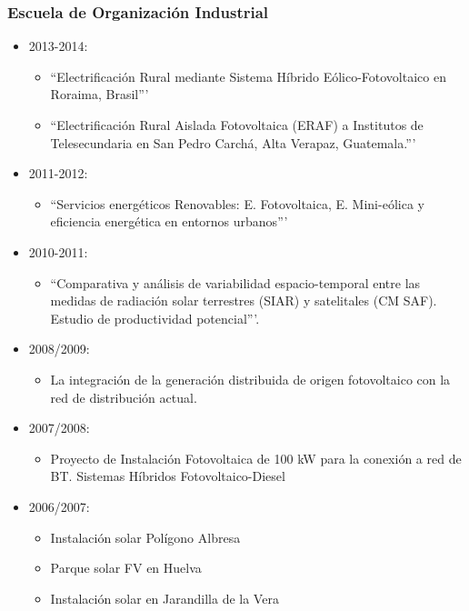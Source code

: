 \documentclass[article, a4paper]{memoir}
\begin{document}
\subsubsection{Escuela de Organización Industrial}
\label{sec-5-3-2}
\begin{itemize}
\item 2013-2014:
\begin{itemize}
\item ``Electrificación Rural mediante Sistema Híbrido Eólico-Fotovoltaico en Roraima, Brasil'''
\item ``Electrificación Rural Aislada Fotovoltaica (ERAF) a Institutos de Telesecundaria en San Pedro Carchá, Alta Verapaz, Guatemala.'''
\end{itemize}
\item 2011-2012:
\begin{itemize}
\item ``Servicios energéticos Renovables: E. Fotovoltaica, E. Mini-eólica y eficiencia energética en entornos urbanos'''
\end{itemize}
\item 2010-2011:
\begin{itemize}
\item ``Comparativa y análisis de variabilidad espacio-temporal entre las medidas de radiación solar terrestres (SIAR) y satelitales (CM SAF). Estudio de productividad potencial'''.
\end{itemize}
\item 2008/2009:
\begin{itemize}
\item \guillemotleft{}La integración de la generación distribuida de origen fotovoltaico con la red de distribución actual.
\end{itemize}
\item 2007/2008:
\begin{itemize}
\item \guillemotleft{}Proyecto de Instalación Fotovoltaica de 100 kW para la conexión a red de BT. Sistemas Híbridos Fotovoltaico-Diesel\guillemotright{}
\end{itemize}
\item 2006/2007:
\begin{itemize}
\item \guillemotleft{}Instalación solar Polígono Albresa\guillemotright{}
\item \guillemotleft{}Parque solar FV en Huelva\guillemotright{}
\item \guillemotleft{}Instalación solar en Jarandilla de la Vera\guillemotright{}

\end{itemize}
\end{itemize}
\end{document}
